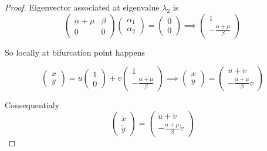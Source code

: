 \begin{proof}
Eigenvector associated at eigenvalue $\lambda_2$ is
\begin{equation}
    \begin{pmatrix}
        \alpha+\mu & \beta \\ 0 & 0
    \end{pmatrix}
    \begin{pmatrix}
        \alpha_1 \\ \alpha_2
    \end{pmatrix} =
    \begin{pmatrix}
        0 \\ 0
    \end{pmatrix}
    \implies
    \begin{pmatrix}
        1 \\ -\frac{\alpha+\mu}{\beta}
    \end{pmatrix}
\end{equation}

So locally at bifurcation point happens

\begin{equation}
    \label{eq:uv}
    \begin{pmatrix} x \\ y \end{pmatrix}
    = u
    \begin{pmatrix} 1 \\ 0 \end{pmatrix} + v
    \begin{pmatrix} 1 \\ -\frac{\alpha + \mu}{\beta}\end{pmatrix}
    \implies \begin{pmatrix} x \\ y \end{pmatrix}
    = \begin{pmatrix} u + v \\ -\frac{\alpha + \mu}{\beta} v \end{pmatrix}
\end{equation}

Consequentialy
\begin{equation}
    \label{eq:uv_dot}
    \begin{pmatrix} \dot{x} \\ \dot{y} \end{pmatrix}
    = \begin{pmatrix} \dot{u} + \dot{v} \\ -\frac{\alpha + \mu}{\beta} \dot{v} \end{pmatrix}
\end{equation}


\end{proof}
